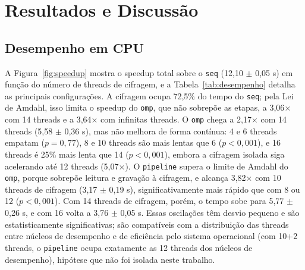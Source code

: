 \documentclass[12pt]{article}
\begin{document}
\section{Resultados e Discussão}

\subsection{Desempenho em CPU}

A Figura~\ref{fig:speedup} mostra o speedup total sobre o \texttt{seq}
(12,10 $\pm$ 0,05 s) em função do número de threads de cifragem, e a
Tabela~\ref{tab:desempenho} detalha as principais configurações. A cifragem
ocupa 72,5\% do tempo do \texttt{seq}; pela Lei de Amdahl, isso limita o
speedup do \texttt{omp}, que não sobrepõe as etapas, a 3,06$\times$ com 14
threads e a 3,64$\times$ com infinitas threads. O \texttt{omp} chega a
2,17$\times$ com 14 threads (5,58 $\pm$ 0,36 s), mas não melhora de forma
contínua: 4 e 6 threads empatam ($p = 0{,}77$), 8 e 10 threads são mais lentas
que 6 ($p < 0{,}001$), e 16 threads é 25\% mais lenta que 14 ($p < 0{,}001$),
embora a cifragem isolada siga acelerando até 12 threads (5,07$\times$).
O \texttt{pipeline} supera o limite de Amdahl do \texttt{omp}, porque sobrepõe
leitura e gravação à cifragem, e alcança 3,82$\times$ com 10 threads de
cifragem (3,17 $\pm$ 0,19 s), significativamente mais rápido que com 8 ou 12
($p < 0{,}001$). Com 14 threads de cifragem, porém, o tempo sobe para
5,77 $\pm$ 0,26 s, e com 16 volta a 3,76 $\pm$ 0,05 s. Essas oscilações têm
desvio pequeno e são estatisticamente significativas; são compatíveis com a
distribuição das threads entre núcleos de desempenho e de eficiência pelo
sistema operacional (com 10+2 threads, o \texttt{pipeline} ocupa exatamente as
12 threads dos núcleos de desempenho), hipótese que não foi isolada neste
trabalho.
\end{document}
